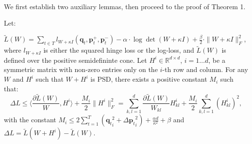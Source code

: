 \documentclass[twoside,11pt]{article}
\newcommand\mat[1]{{#1}}
\renewcommand\vec[1]{\mathbf{#1}}
\newcommand{\W}{\mat{W}}
\newcommand{\Hh}{\mat{H}}
\newcommand{\R}{\mathbb{R}}
\newcommand{\tL}{\tilde{L}(\W)}
\newcommand{\frobsq}[1]{{\|#1\|_F^2}}
\newcommand{\q}{{\vec{q}}}
\newcommand{\trip}{{t}}
\newcommand{\qt}{{\q_{\trip}}}
\newcommand{\grd}{\frac{\partial \tL}{\W}}
\newcommand{\grdkl}{\frac{\partial \tL}{\W_{kl}}}
\begin{document}
We first establish two auxiliary lemmas, then proceed to the proof of Theorem 1.
\label{appendix-proofs}
\begin{lemma}
\label{lem:smooth}
Let:

$\tL=\sum\limits_{t\in T}{l_{\W + \kappa I}(\vec{q}_t, \vec{p}_{t}^{+}, \vec{p}_{t}^{-})} -
\alpha \cdot \log \det(\W + \kappa I) + \tfrac{\beta}{2}  \cdot \| \W + \kappa I \|_{F}^{2}$, 
where $l_{\W + \kappa I}$ is either the squared hinge loss or the log-loss, and $\tL$ is defined over the positive semidefininte cone. 
Let $\Hh^i \in \R^{d \times d}$, $i=1 \ldots d$, be a symmetric matrix with non-zero entries only on the $i$-th row and column.
For any $\W$ and $\Hh^i$ such that $\W + \Hh^i$ is PSD, there exists a positive constant $M_i$ such that:
\begin{equation}
    \label{eq:ineq}
    \Delta L \leq  \langle \grd, \Hh^i \rangle + \frac{M_i}{2} \frobsq{\Hh^i} = \sum_{k,l=1}^d  \grdkl \Hh_{kl}^i + \frac{M_i}{2} \sum_{k,l=1}^d  (\Hh_{kl}^i)^2, \nonumber
\end{equation}
with the constant $M_i \leq  2 \sum_{t=1}^T (\qt_i^2 +{\Delta\vec{p}_{t}}_i^2) + \frac{\alpha d}{\kappa ^2} + \beta$ and $\Delta L = \tilde{L}(\W + \Hh^i) - \tL$.
\end{lemma}
\end{document}
